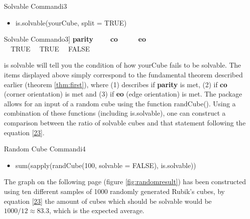 \documentclass{article}
\newcounter{theo}[section]\setcounter{theo}{0}
\begin{document}
\begin{myinput}{Solvable Command}{i3}
\begin{itemize}
\item is.solvable(yourCube, split = TRUE)
\end{itemize}
\end{myinput}
\begin{myoutput}{Solvable Command}{o3}]
  \textbf{parity}\ \ \ \ \ \textbf{co}\ \ \ \ \ \ \textbf{eo}\\
  \ \ TRUE \ \   TRUE  \ \ FALSE
\end{myoutput}

is solvable will tell you the condition of how yourCube fails to be solvable. The items displayed above simply correspond to the fundamental theorem described earlier (theorem \ref{thm:first}), where (1) describes if \textbf{parity} is met, (2) if \textbf{co} (corner orientation) is met and (3) if \textbf{eo} (edge orientation) is met. \newline The package allows for an input of a random cube using the function randCube(). Using a combination of these functions (including is.solvable), one can construct a comparison between the ratio of solvable cubes and that statement following the equation \ref{23}.

\begin{myinput}{Random Cube Command}{i4}
\begin{itemize}
\item sum(sapply(randCube(100, solvable = FALSE), is.solvable))
\end{itemize}
\end{myinput}
The graph on the following page (figure \ref{fig:randomresult}) has been constructed using ten different samples of 1000 randomly generated Rubik's cubes, by equation \ref{23} the amount of cubes which should be solvable would be $1000/12 \approx 83.3$, which is the expected average.\newline 
\end{document}
